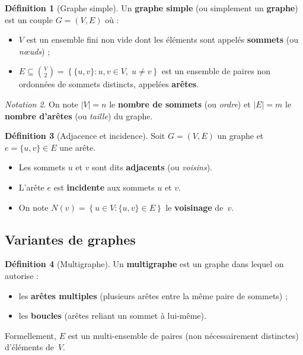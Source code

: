 \documentclass[12pt,a4paper,openany]{book}
\theoremstyle{definition}
\newtheorem{definition}{Définition}[chapter]
\theoremstyle{plain}
\theoremstyle{remark}
\newtheorem{notation}[definition]{Notation}
\newcommand{\abs}[1]{\left|#1\right|}
\newcommand{\set}[1]{\left\{#1\right\}}
\begin{document}
\begin{definition}[Graphe simple]
\label{def:graphe-simple}
Un \textbf{graphe simple} (ou simplement un \textbf{graphe}) est un couple
$G = (V, E)$ où :
\begin{itemize}
  \item $V$ est un ensemble fini non vide dont les éléments sont appelés
    \textbf{sommets} (ou \emph{nœuds}) ;
  \item $E \subseteq \binom{V}{2} = \set{\{u,v\} : u, v \in V,\; u \neq v}$
    est un ensemble de paires non ordonnées de sommets distincts, appelées
    \textbf{arêtes}.
\end{itemize}
\end{definition}

\begin{notation}
\label{not:graph}
On note $\abs{V} = n$ le \textbf{nombre de sommets} (ou \emph{ordre})
et $\abs{E} = m$ le \textbf{nombre d'arêtes} (ou \emph{taille})
du graphe.
\end{notation}

\begin{definition}[Adjacence et incidence]
\label{def:adjacence}
Soit $G = (V, E)$ un graphe et $e = \{u, v\} \in E$ une arête.
\begin{itemize}
  \item Les sommets $u$ et $v$ sont dits \textbf{adjacents} (ou \emph{voisins}).
  \item L'arête $e$ est \textbf{incidente} aux sommets $u$ et $v$.
  \item On note $N(v) = \set{u \in V : \{u,v\} \in E}$ le \textbf{voisinage}
    de~$v$.
\end{itemize}
\end{definition}

\subsection{Variantes de graphes}

\begin{definition}[Multigraphe]
\label{def:multigraphe}
Un \textbf{multigraphe} est un graphe dans lequel on autorise :
\begin{itemize}
  \item les \textbf{arêtes multiples}
    (plusieurs arêtes entre la même paire de sommets) ;
  \item les \textbf{boucles} (arêtes reliant un sommet à lui-même).
\end{itemize}
Formellement, $E$ est un multi-ensemble de paires (non nécessairement distinctes)
d'éléments de~$V$.
\end{definition}
\end{document}
